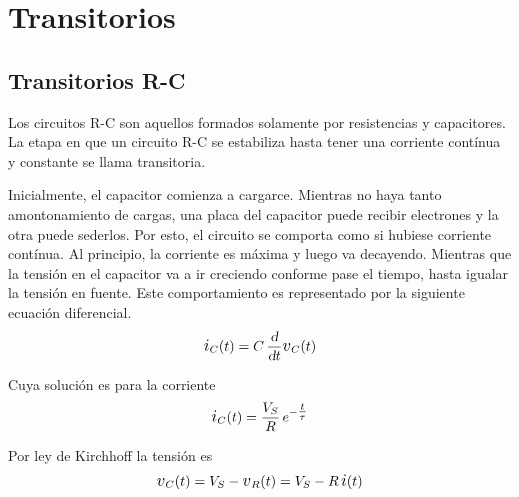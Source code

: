 \chapter{Transitorios}

\renewcommand{\iu}{\hspace{0.5mm}\mathrm{j}\mkern1mu}
\renewcommand{\voltage}{\scale{1.2}{v}}
\renewcommand{\current}{\scale{1.2}{i}}

\section{Transitorios R-C}

Los circuitos R-C son aquellos formados solamente por resistencias y capacitores.
La etapa en que un circuito R-C se estabiliza hasta tener una corriente contínua y constante se llama transitoria.

\begin{center}
    \def\svgwidth{0.5\linewidth}
    
\end{center}

Inicialmente, el capacitor comienza a cargarce.
Mientras no haya tanto amontonamiento de cargas, una placa del capacitor puede recibir electrones y la otra puede sederlos.
Por esto, el circuito se comporta como si hubiese corriente contínua.
Al principio, la corriente es máxima y luego va decayendo.
Mientras que la tensión en el capacitor va a ir creciendo conforme pase el tiempo, hasta igualar la tensión en fuente.
Este comportamiento es representado por la siguiente ecuación diferencial.
\begin{equation*}
    \current_C(t) = C \, \frac{\dif}{\dif t} \voltage_C(t)
\end{equation*}

Cuya solución es para la corriente
\begin{equation*}
    \current_C(t) = \frac{V_S}{R} \, e^{-\tfrac{t}{\tau}}
\end{equation*}

\begin{center}
    \def\svgwidth{0.8\linewidth}
    
\end{center}

Por ley de Kirchhoff la tensión es
\begin{equation*}
    \voltage_C(t) = V_S - \voltage_R(t) = V_S - R \, \current(t)
\end{equation*}

